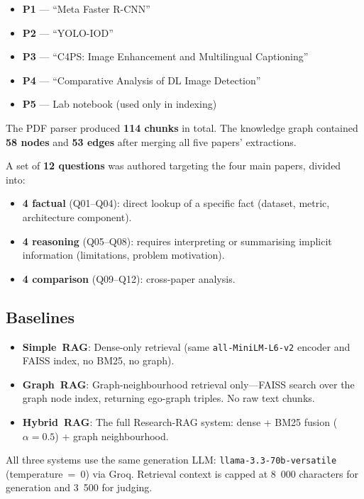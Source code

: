 \documentclass[conference]{IEEEtran}
\begin{document}
\begin{itemize}
  \item \textbf{P1} --- ``Meta Faster R-CNN'' \cite{han2021fasterrcnn}
  \item \textbf{P2} --- ``YOLO-IOD'' \cite{zhang2026yoloincrementalod}
  \item \textbf{P3} --- ``C4PS: Image Enhancement and Multilingual Captioning''
  \item \textbf{P4} --- ``Comparative Analysis of DL Image Detection'' \cite{srivastava2021comparative}
  \item \textbf{P5} --- Lab notebook (used only in indexing)
\end{itemize}

The PDF parser produced \textbf{114 chunks} in total. The knowledge graph
contained \textbf{58 nodes} and \textbf{53 edges} after merging all five
papers' extractions.

A set of \textbf{12 questions} was authored targeting the four main
papers, divided into:
\begin{itemize}
  \item \textbf{4 factual} (Q01--Q04): direct lookup of a specific fact
  (dataset, metric, architecture component).
  \item \textbf{4 reasoning} (Q05--Q08): requires interpreting or
  summarising implicit information (limitations, problem motivation).
  \item \textbf{4 comparison} (Q09--Q12): cross-paper analysis.
\end{itemize}

\subsection{Baselines}
\label{sec:baselines}

\begin{itemize}
  \item \textbf{Simple~RAG}: Dense-only retrieval (same
  \texttt{all-MiniLM-L6-v2} encoder and FAISS index, no BM25, no graph).
  \item \textbf{Graph~RAG}: Graph-neighbourhood retrieval only---FAISS
  search over the graph node index, returning ego-graph triples. No raw
  text chunks.
  \item \textbf{Hybrid~RAG}: The full Research-RAG system: dense + BM25
  fusion ($\alpha = 0.5$) + graph neighbourhood.
\end{itemize}

All three systems use the same generation LLM:
\texttt{llama-3.3-70b-versatile} (temperature~=~0) via Groq.
Retrieval context is capped at 8~000 characters for generation and
3~500 for judging.
\end{document}
